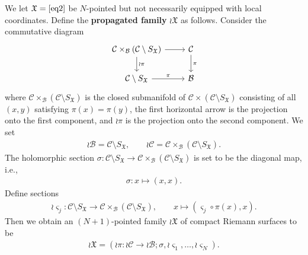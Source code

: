 \documentclass[12pt,a4paper,notitlepage]{article}
\theoremstyle{definition}
\theoremstyle{plain}
\newcommand{\fk}{\mathfrak}
\newcommand{\mc}{\mathcal}
\newcommand{\sgm}{\varsigma}
\newcommand{\SX}{{S_{\fk X}}}
\numberwithin{equation}{section}
\begin{document}
We let $\fk X=\eqref{eq2}$ be $N$-pointed but not necessarily equipped with local coordinates. Define the \textbf{propagated family} $\wr\fk X$ as follows. Consider the commutative diagram 
\begin{equation*}
\begin{tikzcd}
\mc C\times_{\mc B}(\mc C\setminus\SX) \arrow[r] \arrow[d, "\wr\pi"] & \mc C \arrow[d, "\pi"] \\
\mc C\setminus\SX\arrow[r, "\pi"] & \mc B
\end{tikzcd}	
\end{equation*}
where $\mc C\times_{\mc B}(\mc C\setminus\SX)$ is the closed submanifold of $\mc C\times(\mc C\setminus\SX)$ consisting of all $(x,y)$ satisfying $\pi(x)=\pi(y)$, the first horizontal arrow is the projection onto the first component, and $\wr\pi$ is the projection onto the second component. \index{X@$\wr\fk X,\wr\mc C,\wr\mc B,\wr\pi$} We set
\begin{align*}
	\wr\mc B=\mc C\setminus\SX,\qquad \wr\mc C=\mc C\times_{\mc B}(\mc C\setminus\SX).	
\end{align*}
The holomorphic section $\sigma:\mc C\setminus\SX\rightarrow\mc C\times_{\mc B}(\mc C\setminus\SX)$ is set to be the diagonal map, i.e.,
\begin{align*}
\sigma:x\mapsto (x,x).	
\end{align*}
Define sections \index{zz@$\wr\sgm_j,\wr^n\sgm_j$}
\begin{align*}
\wr\sgm_j:\mc C\setminus\SX\rightarrow\mc C\times_{\mc B}(\mc C\setminus\SX),\qquad x\mapsto (\sgm_j\circ\pi(x),x).
\end{align*}
Then we obtain an $(N+1)$-pointed family $\wr\fk X$ of compact Riemann surfaces to be
\begin{align}
\wr\fk X=(\wr\pi:\wr\mc C\rightarrow\wr\mc B;\sigma,\wr\sgm_1,\dots,\wr\sgm_N).	\label{eq7}
\end{align}
\end{document}
